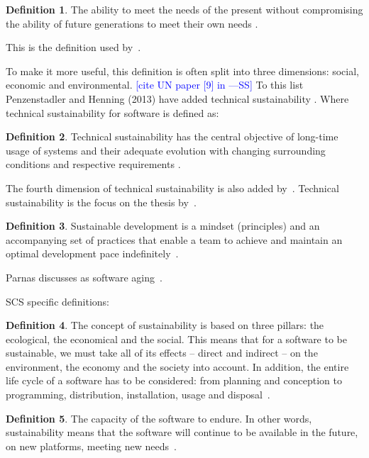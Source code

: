 \documentclass[letterpaper,cleveref]{lipics-v2019}
\newcommand{\authornote}[3]{\textcolor{#1}{[#3 ---#2]}}
\newcommand{\authornote}[3]{}
\newcommand{\wss}[1]{\authornote{blue}{SS}{#1}} %
\theoremstyle{definition}
\newtheorem{defn}{Definition}
\begin{document}
\begin{defn}
\noindent The ability to meet the needs of the present without compromising the ability of
future generations to meet their own needs \cite{Brundtland1987}.
\end{defn}

This is the definition used by~\cite{IISD2019}.

To make it more useful, this definition is often split into three dimensions:
social, economic and environmental. \wss{cite UN paper [9] in
  \cite{PenzenstadlerAndHenning2013}}  To this list Penzenstadler and Henning
(2013) have added technical sustainability \cite{PenzenstadlerAndHenning2013}.
Where technical sustainability for software is defined as:

\begin{defn}
\noindent Technical sustainability has the central objective of long-time
usage of systems and their adequate evolution with changing surrounding
conditions and respective requirements \cite{PenzenstadlerAndHenning2013}.
\end{defn}

The fourth dimension of technical sustainability is also added
by~\cite{WolframEtAl2017}.  Technical sustainability is the focus on the thesis
by~\cite{Hygerth2016}.

\begin{defn}
  \noindent Sustainable development is a mindset (principles) and an
  accompanying set of practices that enable a team to achieve and maintain an
  optimal development pace indefinitely~\cite{Tate2005}.
\end{defn}

Parnas discusses as software aging~\cite{Parnas1994a}.

SCS specific definitions:

\begin{defn}
  The concept of sustainability is based on three pillars: the
  ecological, the economical and the social. This means that for a software to
  be sustainable, we must take all of its effects -- direct and indirect -- on
  the environment, the economy and the society into account. In addition, the
  entire life cycle of a software has to be considered: from planning and
  conception to programming, distribution, installation, usage and
  disposal~\cite{Heine2017}.
\end{defn}

\begin{defn}
  \noindent The capacity of the software to endure. In other words,
  sustainability means that the software will continue to be available in the
  future, on new platforms, meeting new needs~\cite{Katz2016}.
\end{defn}
\end{document}
